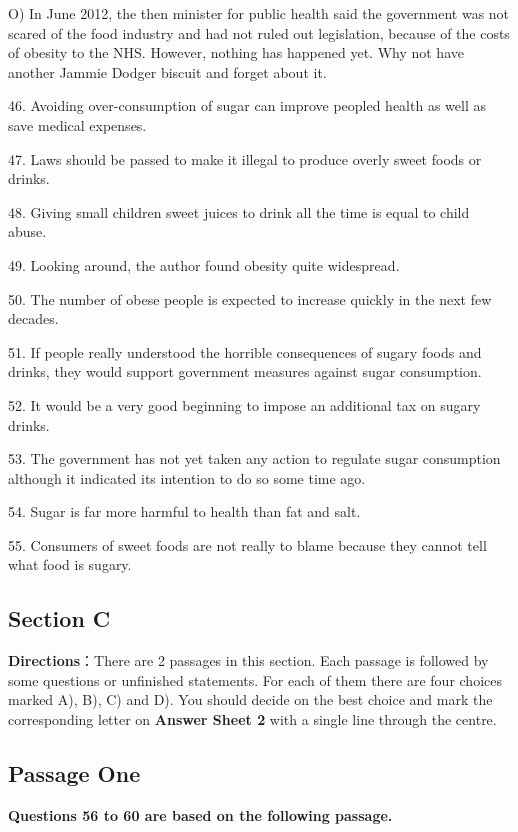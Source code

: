 \documentclass[UTF8,11pt]{ctexart}
\begin{document}
O) In June 2012, the then minister for public health said the government was not scared of the food industry and had not ruled out legislation, because of the costs of obesity to the NHS. However, nothing has happened yet. Why not have another Jammie Dodger biscuit and forget about it.


46. Avoiding over-consumption of sugar can improve peopled health as well as save medical expenses.


47. Laws should be passed to make it illegal to produce overly sweet foods or drinks.


48. Giving small children sweet juices to drink all the time is equal to child abuse.


49. Looking around, the author found obesity quite widespread.


50. The number of obese people is expected to increase quickly in the next few decades.


51. If people really understood the horrible consequences of sugary foods and drinks, they would support government measures against sugar consumption.


52. It would be a very good beginning to impose an additional tax on sugary drinks.


53. The government has not yet taken any action to regulate sugar consumption although it indicated its intention to do so some time ago.


54. Sugar is far more harmful to health than fat and salt.


55. Consumers of sweet foods are not really to blame because they cannot tell what food is sugary.


\subsection*{\textbf{Section C}}


\textbf{Directions}：There are 2 passages in this section. Each passage is followed by some questions or unfinished statements. For each of them there are four choices marked A), B), C) and D). You should decide on the best choice and mark the corresponding letter on\textbf{ Answer Sheet 2} with a single line through the centre.


\subsection*{\textbf{Passage One}}


\textbf{Questions 56 to 60 are based on the following passage.}
\end{document}
